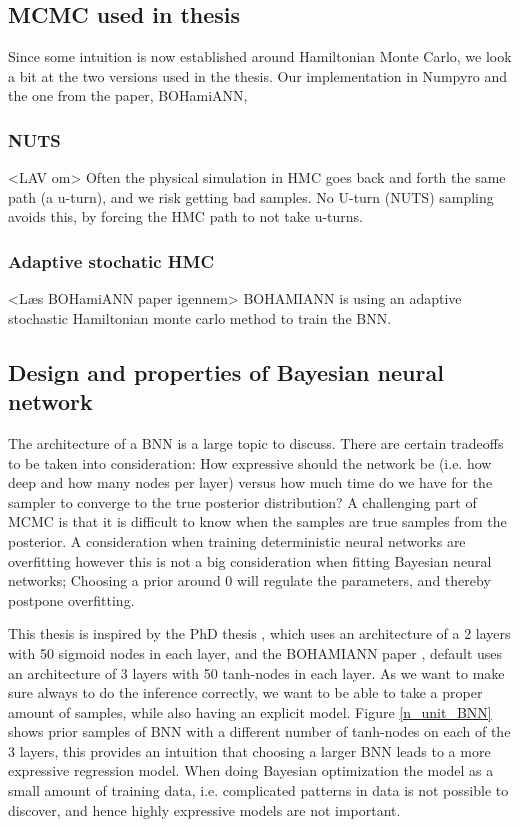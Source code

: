 \subsection{MCMC used in thesis}
Since some intuition is now established around Hamiltonian Monte Carlo, 
we look a bit at the two versions used in the thesis. Our implementation in Numpyro
and the one from the paper, BOHamiANN, 

\subsubsection{NUTS}
<LAV om>
Often the physical simulation in HMC goes back and forth the same path (a u-turn), and we risk getting bad samples.
No U-turn (NUTS) sampling avoids this, by forcing the HMC path to not take u-turns. 

\subsubsection{Adaptive stochatic HMC}
<Læs BOHamiANN paper igennem>
BOHAMIANN is using an adaptive stochastic Hamiltonian monte carlo method to train the BNN. 


\subsection{Design and properties of Bayesian neural network}
The architecture of a BNN is a large topic to discuss. There are certain tradeoffs to be taken into
consideration: How expressive should the network be (i.e. how deep and how many nodes per layer)
versus how much time do we have for the sampler to converge to the true posterior distribution? A
challenging part of MCMC is that it is difficult to know when the samples are true samples from the
posterior. A consideration when training deterministic neural networks are overfitting however this
is not a big consideration when fitting Bayesian neural networks; Choosing a prior around 0 will
regulate the parameters, and thereby postpone overfitting. 

This thesis is inspired by the PhD thesis \cite{PhDthesis}, which uses an architecture of a 2 layers
with 50 sigmoid nodes in each layer, and the BOHAMIANN paper \cite{BOHAMIANN}, default uses an architecture
of 3 layers with 50 tanh-nodes in each layer. As we want to make sure always to do the 
inference correctly, we want to be able to take a proper amount of samples, while also
having an explicit model. Figure \eqref{n_unit_BNN} shows prior samples of BNN with a different
number of tanh-nodes on each of the 3 layers, this provides an intuition that choosing a larger
BNN leads to a more expressive regression model. When doing Bayesian optimization the model as a small
amount of training data, i.e. complicated patterns in data is not possible to discover, and hence 
highly expressive models are not important. 


